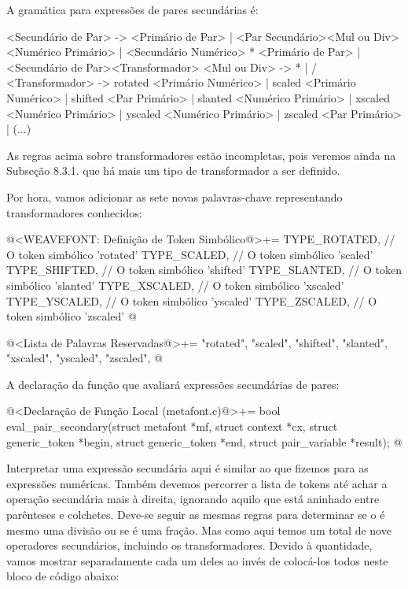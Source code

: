 
A gramática para expressões de pares secundárias é:

\alinhaverbatim
<Secundário de Par> -> <Primário de Par> |
                       <Par Secundário><Mul ou Div><Numérico Primário> |
                       <Secundário Numérico> * <Primário de Par> |
                       <Secundário de Par><Transformador>
<Mul ou Div> -> * | /
<Transformador> -> rotated <Primário Numérico> |
                   scaled <Primário Numérico> |
                   shifted <Par Primário> |
                   slanted <Numérico Primário> |
                   xscaled <Numérico Primário> |
                   yscaled <Numérico Primário> |
                   zscaled <Par Primário> | (...)
\alinhanormal

As regras acima sobre transformadores estão incompletas, pois veremos
ainda na Subseção 8.3.1. que há mais um tipo de transformador a ser
definido.

Por hora, vamos adicionar as sete novas palavras-chave representando
transformadores conhecidos:

\iniciocodigo
@<WEAVEFONT: Definição de Token Simbólico@>+=
TYPE_ROTATED,  // O token simbólico 'rotated'
TYPE_SCALED,   // O token simbólico 'scaled'
TYPE_SHIFTED,  // O token simbólico 'shifted'
TYPE_SLANTED,  // O token simbólico 'slanted'
TYPE_XSCALED,  // O token simbólico 'xscaled'
TYPE_YSCALED,  // O token simbólico 'yscaled'
TYPE_ZSCALED,  // O token simbólico 'zscaled'
@
\fimcodigo

\iniciocodigo
@<Lista de Palavras Reservadas@>+=
"rotated", "scaled", "shifted", "slanted", "xscaled", "yscaled",
"zscaled",
@
\fimcodigo

A declaração da função que avaliará expressões secundárias de pares:

\iniciocodigo
@<Declaração de Função Local (metafont.c)@>+=
bool eval_pair_secondary(struct metafont *mf, struct context *cx,
                         struct generic_token *begin,
                         struct generic_token *end,
                         struct pair_variable *result);
@
\fimcodigo


Interpretar uma expressão secundária aqui é similar ao que fizemos
para as expressões numéricas. Também devemos percorrer a lista de
tokens até achar a operação secundária mais à direita, ignorando
aquilo que está aninhado entre parênteses e colchetes. Deve-se seguir
as mesmas regras para determinar se o \monoespaco{/} é mesmo uma
divisão ou se é uma fração. Mas como aqui temos um total de nove
operadores secundários, incluindo os transformadores. Devido à
quantidade, vamos mostrar separadamente cada um deles ao invés de
colocá-los todos neste bloco de código abaixo:

